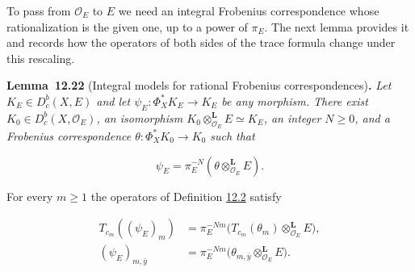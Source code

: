 \documentclass[11pt]{article}
\newenvironment{bpstatement}[2]{\par\addvspace{0.6\baselineskip}\noindent\textbf{#1}#2\textbf{.}\enspace\ignorespaces}
  {\par\addvspace{0.4\baselineskip}}
\newenvironment{bpstatementit}[2]{\begin{bpstatement}{#1}{#2}\itshape\ignorespaces}{\end{bpstatement}}
\providecommand{\Dbc}{}\renewcommand{\Dbc}{D^b_c}
\begin{document}
\label{bp68}%
To pass from \(\mathcal O_E\) to \(E\) we need an integral Frobenius correspondence whose rationalization is the given one, up to a power of \(\pi_E\). The next lemma provides it and records how the operators of both sides of the trace formula change under this rescaling.

\label{bp69}%
\begin{bpstatementit}{Lemma~12.22}{ (Integral models for rational Frobenius correspondences)}
Let \(K_E\in\Dbc(X,E)\) and let \(\psi_E:\Phi_X^*K_E\to K_E\) be any morphism. There exist \(K_0\in\Dbc(X,\mathcal O_E)\), an isomorphism \(K_0\otimes^{\mathbf L}_{\mathcal O_E}E\simeq K_E\), an integer \(N\geq0\), and a Frobenius correspondence \(\theta:\Phi_X^*K_0\to K_0\) such that

\[
\psi_E=\pi_E^{-N}(\theta\otimes^{\mathbf L}_{\mathcal O_E}E).
\]

For every \(m\geq1\) the operators of Definition \hyperref[bp7]{12.2} satisfy

\[
\begin{aligned}
T_{c_m}((\psi_E)_m)&=\pi_E^{-Nm}
\bigl(T_{c_m}(\theta_m)\otimes^{\mathbf L}_{\mathcal O_E}E\bigr),\\
(\psi_E)_{m,\bar y}&=\pi_E^{-Nm}
\bigl(\theta_{m,\bar y}\otimes^{\mathbf L}_{\mathcal O_E}E\bigr).
\end{aligned}
\tag{12.2}
\]
\end{bpstatementit}
\end{document}
